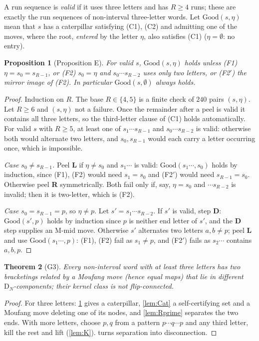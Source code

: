 \documentclass[11pt,a4paper]{article}
\newtheorem{thm}{Theorem}[section]
\newtheorem{proposition}[thm]{Proposition}
\theoremstyle{definition}
\theoremstyle{remark}
\newcommand{\DN}{\mathrm{D}_N}
\begin{document}
A run sequence is \emph{valid} if it uses three letters and has $R\ge4$ runs; these are exactly the run
sequences of non-interval three-letter words. Let $\mathrm{Good}(s,\eta)$ mean that $s$ has a
caterpillar satisfying (C1), (C2) and admitting one of the moves, where the root, \emph{entered} by the
letter $\eta$, also satisfies (C1) ($\eta=\emptyset$: no entry).

\begin{proposition}[Proposition E]\label{prop:E}
For valid $s$, $\mathrm{Good}(s,\eta)$ holds unless (F1) $\eta=s_0=s_{R-1}$, or (F2) $s_0=\eta$ and
$s_0\cdots s_{R-2}$ uses only two letters, or (F2$'$) the mirror image of (F2). In particular
$\mathrm{Good}(s,\emptyset)$ always holds.
\end{proposition}
\begin{proof}
Induction on $R$. The base $R\in\{4,5\}$ is a finite check of $240$ pairs $(s,\eta)$. Let $R\ge6$ and
$(s,\eta)$ not a failure. Once the remainder after a peel is valid it contains all three letters, so the
third-letter clause of (C1) holds automatically. For valid $s$ with $R\ge5$, at least one of
$s_1\cdots s_{R-1}$ and $s_0\cdots s_{R-2}$ is valid: otherwise both would alternate two letters, and
$s_0,s_{R-1}$ would each carry a letter occurring once, which is impossible.

\emph{Case $s_0\ne s_{R-1}$.} Peel \textbf{L} if $\eta\ne s_0$ and $s_1\cdots$ is valid:
$\mathrm{Good}(s_1\cdots,s_0)$ holds by induction, since (F1), (F2) would need $s_1=s_0$ and (F2$'$)
would need $s_{R-1}=s_0$. Otherwise peel \textbf{R} symmetrically. Both fail only if, say, $\eta=s_0$ and
$\cdots s_{R-2}$ is invalid; then it is two-letter, which is (F2).

\emph{Case $s_0=s_{R-1}=p$}, so $\eta\ne p$. Let $s'=s_1\cdots s_{R-2}$. If $s'$ is valid, step
\textbf{D}: $\mathrm{Good}(s',p)$ holds by induction since $p$ is neither end letter of $s'$, and the
\textbf{D} step supplies an M-mid move. Otherwise $s'$ alternates two letters $a,b\ne p$; peel
\textbf{L} and use $\mathrm{Good}(s_1\cdots,p)$: (F1), (F2) fail as $s_1\ne p$, and (F2$'$) fails as
$s_2\cdots$ contains $a,b,p$.
\end{proof}

\begin{thm}[G3]\label{thm:G3}
Every non-interval word with at least three letters has two bracketings related by a Moufang move (hence
equal maps) that lie in different $\DN$-components; their kernel class is not flip-connected.
\end{thm}
\begin{proof}
For three letters: \cref{prop:E} gives a caterpillar, \cref{lem:Cat} a self-certifying set and a Moufang
move deleting one of its nodes, and \cref{lem:Rprime} separates the two ends. With more letters, choose
$p,q$ from a pattern $p\cdots q\cdots p$ and any third letter, kill the rest and lift (\cref{lem:K}).
 turns separation into disconnection.
\end{proof}
\end{document}
